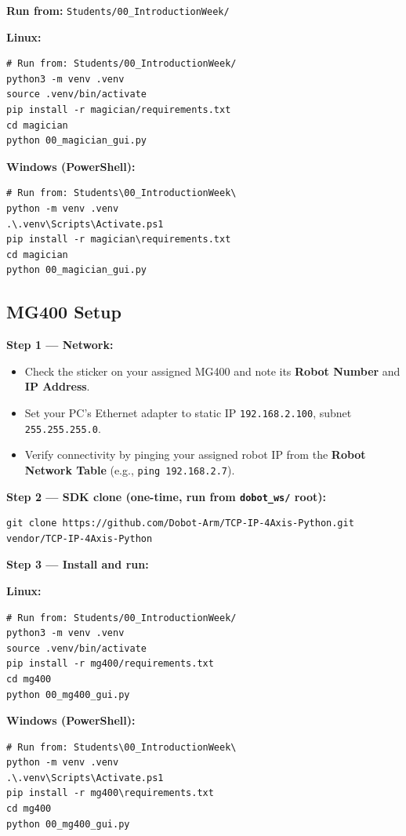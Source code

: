\documentclass[11pt,a4paper]{article}
\begin{document}
\begin{tcolorbox}[setupbox, title={Magician — Environment Setup}]
\textbf{Run from:} \texttt{Students/00\_IntroductionWeek/}

\smallskip
\textbf{Linux:}
\begin{lstlisting}[style=BashStyle]
# Run from: Students/00_IntroductionWeek/
python3 -m venv .venv
source .venv/bin/activate
pip install -r magician/requirements.txt
cd magician
python 00_magician_gui.py
\end{lstlisting}

\textbf{Windows (PowerShell):}
\begin{lstlisting}[style=BashStyle]
# Run from: Students\00_IntroductionWeek\
python -m venv .venv
.\.venv\Scripts\Activate.ps1
pip install -r magician\requirements.txt
cd magician
python 00_magician_gui.py
\end{lstlisting}
\end{tcolorbox}

\subsection*{MG400 Setup}

\begin{tcolorbox}[setupbox, title={MG400 — Environment Setup}]
\textbf{Step 1 — Network:}
\begin{itemize}
  \item Check the sticker on your assigned MG400 and note its \textbf{Robot Number} and \textbf{IP Address}.
  \item Set your PC's Ethernet adapter to static IP \texttt{192.168.2.100}, subnet \texttt{255.255.255.0}.
  \item Verify connectivity by pinging your assigned robot IP from the \textbf{Robot Network Table} (e.g., \texttt{ping 192.168.2.7}).
\end{itemize}

\smallskip
\textbf{Step 2 — SDK clone (one-time, run from \texttt{dobot\_ws/} root):}
\begin{lstlisting}[style=BashStyle]
git clone https://github.com/Dobot-Arm/TCP-IP-4Axis-Python.git vendor/TCP-IP-4Axis-Python
\end{lstlisting}

\textbf{Step 3 — Install and run:}

\textbf{Linux:}
\begin{lstlisting}[style=BashStyle]
# Run from: Students/00_IntroductionWeek/
python3 -m venv .venv
source .venv/bin/activate
pip install -r mg400/requirements.txt
cd mg400
python 00_mg400_gui.py
\end{lstlisting}

\textbf{Windows (PowerShell):}
\begin{lstlisting}[style=BashStyle]
# Run from: Students\00_IntroductionWeek\
python -m venv .venv
.\.venv\Scripts\Activate.ps1
pip install -r mg400\requirements.txt
cd mg400
python 00_mg400_gui.py
\end{lstlisting}
\end{tcolorbox}
\end{document}
